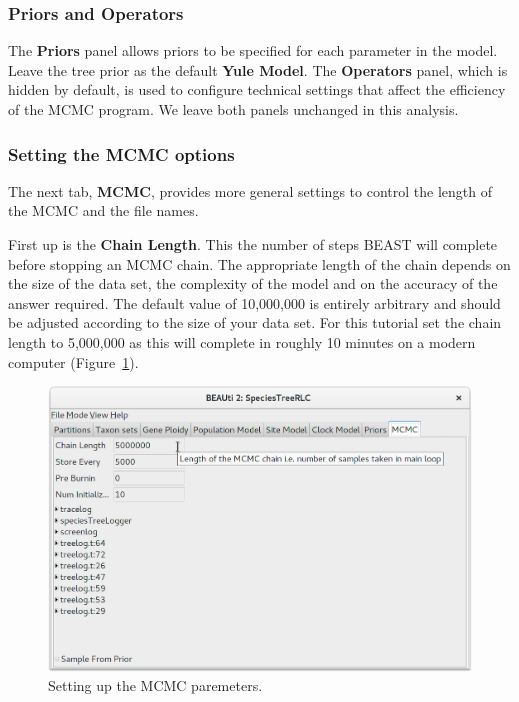 \documentclass{article}
\begin{document}
\subsubsection*{Priors and Operators}

The \textbf{Priors} panel allows priors to be specified for each parameter in
the model. Leave the tree prior as the default \textbf{Yule Model}. The
\textbf{Operators} panel, which is hidden by default, is used to configure
technical settings that affect the efficiency of the MCMC program. We leave both
panels unchanged in this analysis.

\subsubsection*{Setting the MCMC options }

The next tab, \textbf{MCMC}, provides more general settings to control the
length of the MCMC and the file names.

First up is the \textbf{Chain Length}. This the number of steps BEAST will
complete before stopping an MCMC chain. The appropriate length of the chain
depends on the size of the data set, the complexity of the model and on the
accuracy of the answer required. The default value of 10,000,000 is entirely
arbitrary and should be adjusted according to the size of your data set. For
this tutorial set the chain length to 5,000,000 as this will complete in roughly
10 minutes on a modern computer (Figure~\ref{fig:mcmc}).

\begin{figure}[htb!]
\centering
\includegraphics[width=\textwidth]{figures/beauti-mcmc.png}
\caption{Setting up the MCMC paremeters.}
\label{fig:mcmc}
\end{figure}
\end{document}
